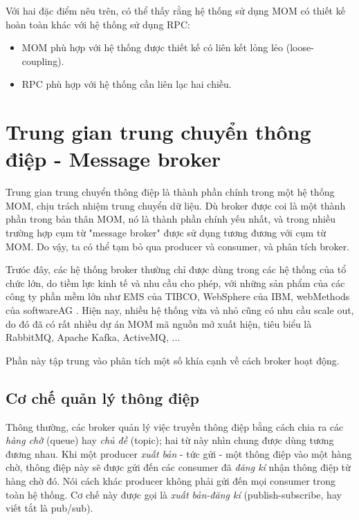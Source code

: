 \documentclass{article}
\begin{document}
Với hai đặc điểm nêu trên, có thể thấy rằng hệ thống sử dụng MOM có thiết kế
hoàn toàn khác với hệ thống sử dụng RPC:

\begin{itemize}
    \item MOM phù hợp với hệ thống được thiết kế có liên kết lỏng lẻo
    (loose-coupling).
    \item RPC phù hợp với hệ thống cần liên lạc hai chiều.
\end{itemize}

\section{Trung gian trung chuyển thông điệp - Message broker}

Trung gian trung chuyển thông điệp là thành phần chính trong một hệ thống MOM,
chịu trách nhiệm trung chuyển dữ liệu. Dù broker được coi là một thành phần
trong bản thân MOM, nó là thành phần chính yếu nhất, và trong nhiều trường hợp
cụm từ "message broker" được sử dụng tương đương với cụm từ MOM. Do vậy, ta có
thể tạm bỏ qua producer và consumer, và phân tích broker.

Trưóc đây, các hệ thống broker thường chỉ được dùng trong các hệ thống của tổ
chức lớn, do tiềm lực kinh tế và nhu cầu cho phép, với những sản phẩm của các
công ty phần mềm lớn như EMS của TIBCO, WebSphere của IBM, webMethods của
softwareAG \cite{Kleppmann17C}. Hiện nay, nhiều hệ thống vừa và nhỏ cũng có nhu
cầu scale out, do đó đã có rất nhiều dự án MOM mã nguồn mở xuất hiện, tiêu biểu
là RabbitMQ, Apache Kafka, ActiveMQ, ...

Phần này tập trung vào phân tích một số khía cạnh về cách broker hoạt động.

\subsection{Cơ chế quản lý thông điệp}

Thông thường, các broker quản lý việc truyền thông điệp bằng cách chia ra các
\emph{hàng chờ} (queue) hay \emph{chủ đề} (topic); hai từ này nhìn chung được
dùng tương đương nhau. Khi một producer \emph{xuất bản} - tức gửi - một thông
điệp vào một hàng chờ, thông điệp này sẽ được gửi đến các consumer đã \emph{đăng
kí} nhận thông điệp từ hàng chờ đó. Nói cách khác producer không phải gửi đến
mọi consumer trong toàn hệ thống. Cơ chế này được gọi là \emph{xuất bản-đăng kí}
(publish-subscribe, hay viết tắt là pub/sub).
\end{document}
